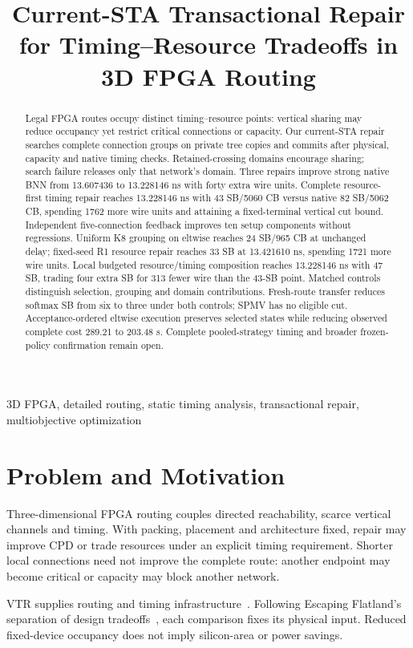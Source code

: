 \documentclass[conference,10pt]{IEEEtran}
\title{Current-STA Transactional Repair for Timing--Resource Tradeoffs in 3D FPGA Routing}
\author{\IEEEauthorblockN{Anonymous development manuscript}}
\begin{document}
\maketitle
\begin{abstract}
Legal FPGA routes occupy distinct timing--resource points: vertical sharing may reduce occupancy yet restrict critical connections or capacity. Our current-STA repair searches complete connection groups on private tree copies and commits after physical, capacity and native timing checks. Retained-crossing domains encourage sharing; search failure releases only that network's domain. Three repairs improve strong native BNN from 13.607436 to 13.228146 ns with forty extra wire units. Complete resource-first timing repair reaches 13.228146 ns with 43 SB/5060 CB versus native 82 SB/5062 CB, spending 1762 more wire units and attaining a fixed-terminal vertical cut bound. Independent five-connection feedback improves ten setup components without regressions. Uniform K8 grouping on eltwise reaches 24 SB/965 CB at unchanged delay; fixed-seed R1 resource repair reaches 33 SB at 13.421610 ns, spending 1721 more wire units. Local budgeted resource/timing composition reaches 13.228146 ns with 47 SB, trading four extra SB for 313 fewer wire than the 43-SB point. Matched controls distinguish selection, grouping and domain contributions. Fresh-route transfer reduces softmax SB from six to three under both controls; SPMV has no eligible cut. Acceptance-ordered eltwise execution preserves selected states while reducing observed complete cost 289.21 to 203.48 s. Complete pooled-strategy timing and broader frozen-policy confirmation remain open.
\end{abstract}
\begin{IEEEkeywords}
3D FPGA, detailed routing, static timing analysis, transactional repair, multiobjective optimization
\end{IEEEkeywords}

\section{Problem and Motivation}
Three-dimensional FPGA routing couples directed reachability, scarce vertical channels and timing. With packing, placement and architecture fixed, repair may improve CPD or trade resources under an explicit timing requirement. Shorter local connections need not improve the complete route: another endpoint may become critical or capacity may block another network.

VTR supplies routing and timing infrastructure~\cite{vtr9paper}. Following Escaping Flatland's separation of design tradeoffs~\cite{flatland}, each comparison fixes its physical input. Reduced fixed-device occupancy does not imply silicon-area or power savings.
\end{document}
